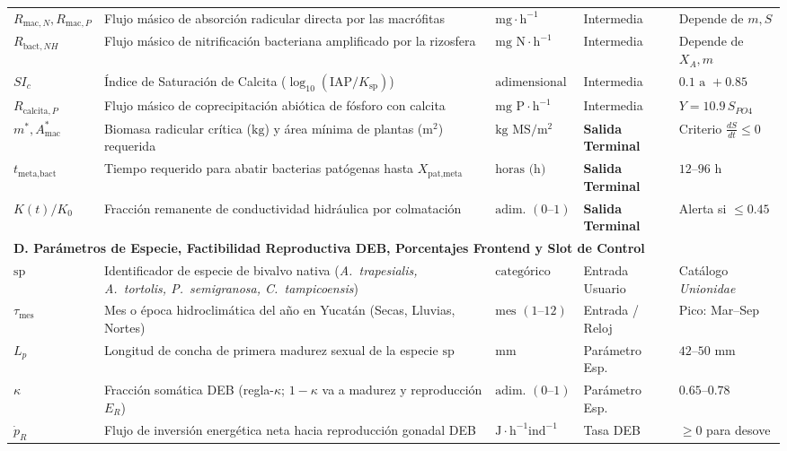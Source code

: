 \documentclass[11pt,letterpaper]{article}
\begin{document}
{\begin{longtable}{p{1.85cm} p{5.95cm} p{2.15cm} p{2.15cm} p{2.55cm}}
$R_{\text{mac},N}, R_{\text{mac},P}$ & Flujo másico de absorción radicular directa por las macrófitas & $\text{mg}\cdot\text{h}^{-1}$ & Intermedia & Depende de $m, S$ \\
$R_{\text{bact},NH}$ & Flujo másico de nitrificación bacteriana amplificado por la rizosfera & $\text{mg N}\cdot\text{h}^{-1}$ & Intermedia & Depende de $X_A, m$ \\
$SI_c$ & Índice de Saturación de Calcita ($\log_{10}(\text{IAP}/K_{\text{sp}})$) & $\text{adimensional}$ & Intermedia & $0.1\text{ a }+0.85$ \\
$R_{\text{calcita},P}$ & Flujo másico de coprecipitación abiótica de fósforo con calcita & $\text{mg P}\cdot\text{h}^{-1}$ & Intermedia & $Y = 10.9\,S_{PO4}$ \\
$m^*, A_{\text{mac}}^*$ & Biomasa radicular crítica ($\text{kg}$) y área mínima de plantas ($\text{m}^2$) requerida & $\text{kg MS} / \text{m}^2$ & \textbf{Salida Terminal} & Criterio $\frac{dS}{dt}\le 0$ \\
$t_{\text{meta,bact}}$ & Tiempo requerido para abatir bacterias patógenas hasta $X_{\text{pat,meta}}$ & $\text{horas (h)}$ & \textbf{Salida Terminal} & $12\text{--}96\text{ h}$ \\
$K(t)/K_0$ & Fracción remanente de conductividad hidráulica por colmatación & $\text{adim. } (0\text{--}1)$ & \textbf{Salida Terminal} & Alerta si $\le 0.45$ \\
\hline
\multicolumn{5}{l}{\textbf{D. Parámetros de Especie, Factibilidad Reproductiva DEB, Porcentajes Frontend y Slot de Control}} \\
\hline
$\text{sp}$ & Identificador de especie de bivalvo nativa (\textit{A.\ trapesialis, A.\ tortolis, P.\ semigranosa, C.\ tampicoensis}) & $\text{categórico}$ & Entrada Usuario & Catálogo \textit{Unionidae} \\
$\tau_{\text{mes}}$ & Mes o época hidroclimática del año en Yucatán (Secas, Lluvias, Nortes) & $\text{mes } (1\text{--}12)$ & Entrada / Reloj & Pico: Mar--Sep \\
$L_p$ & Longitud de concha de primera madurez sexual de la especie $\text{sp}$ & $\text{mm}$ & Parámetro Esp. & $42\text{--}50\text{ mm}$ \\
$\kappa$ & Fracción somática DEB (regla-$\kappa$; $1-\kappa$ va a madurez y reproducción $E_R$) & $\text{adim. } (0\text{--}1)$ & Parámetro Esp. & $0.65\text{--}0.78$ \\
$\dot{p}_R$ & Flujo de inversión energética neta hacia reproducción gonadal DEB & $\text{J}\cdot\text{h}^{-1}\text{ind}^{-1}$ & Tasa DEB & $\ge 0$ para desove \\

\end{longtable}}
\end{document}
